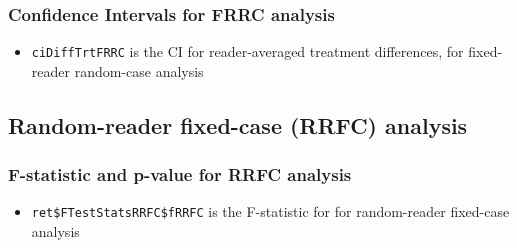 \documentclass[
]{book}
\newenvironment{Shaded}{\begin{snugshade}}{\end{snugshade}}
\newcommand{\CommentTok}[1]{\textcolor[rgb]{0.56,0.35,0.01}{\textit{#1}}}
\newcommand{\NormalTok}[1]{#1}
\newcommand{\OperatorTok}[1]{\textcolor[rgb]{0.81,0.36,0.00}{\textbf{#1}}}
\providecommand{\tightlist}{%
  \setlength{\itemsep}{0pt}\setlength{\parskip}{0pt}}
\begin{document}
\hypertarget{confidence-intervals-for-frrc-analysis-1}{%
\subsubsection{Confidence Intervals for FRRC analysis}\label{confidence-intervals-for-frrc-analysis-1}}

\begin{itemize}
\tightlist
\item
  \texttt{ciDiffTrtFRRC} is the CI for reader-averaged treatment differences, for fixed-reader random-case analysis
\end{itemize}

\begin{Shaded}
\end{Shaded}

\hypertarget{random-reader-fixed-case-rrfc-analysis}{%
\subsection{Random-reader fixed-case (RRFC) analysis}\label{random-reader-fixed-case-rrfc-analysis}}

\hypertarget{f-statistic-and-p-value-for-rrfc-analysis}{%
\subsubsection{F-statistic and p-value for RRFC analysis}\label{f-statistic-and-p-value-for-rrfc-analysis}}

\begin{itemize}
\tightlist
\item
  \texttt{ret\$FTestStatsRRFC\$fRRFC} is the F-statistic for for random-reader fixed-case analysis
\end{itemize}

\begin{Shaded}
\end{Shaded}
\end{document}
